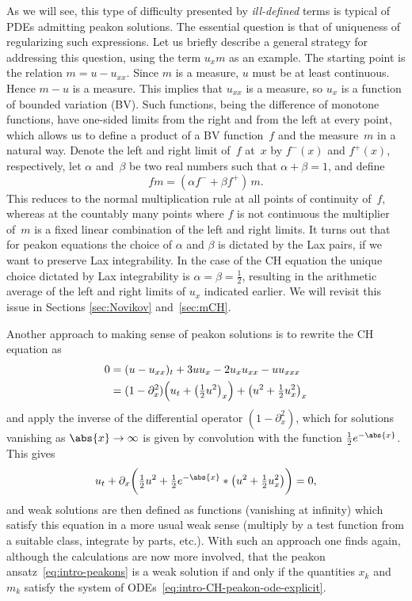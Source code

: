 \documentclass[10pt,a4paper]{article} \pdfoutput=1 
\begin{document}
As we will see, this type of difficulty presented by \emph{ill-defined} terms is typical of
PDEs admitting peakon solutions.
The essential question is that of uniqueness of regularizing such expressions.
Let us briefly describe a general strategy for addressing this question,
using the term $u_x m$ as an example.
The starting point is the relation $m=u-u_{xx}$. Since $m$ is a
measure, $u$ must be at least continuous. Hence $m-u$ is a measure.
This implies that $u_{xx}$ is a measure, so $u_x$ is a function of
bounded variation (BV).
Such functions, being the difference of monotone functions,
have one-sided limits from the right and from the left at every point,
which allows us to define a product of a BV function~$f$ and the measure~$m$ in a natural way.
Denote the left and right limit of~$f$ at~$x$ by $f^-(x)$ and $f^+(x)$, respectively,
let $\alpha$ and~$\beta$ be two real numbers such that $\alpha +\beta=1$,
and define
\begin{equation}
  \label{eq:CH-multiplication-f-times-m}
  f m = (\alpha f^- + \beta f^+) \, m
  .
\end{equation}
This reduces to the normal multiplication rule at all points of continuity of~$f$,
whereas at the countably many points where $f$ is not continuous
the multiplier of~$m$ is a fixed linear combination of the left and right limits.
It turns out that for peakon equations the choice of $\alpha$ and $\beta$ is dictated by the Lax pairs, if we want to preserve Lax integrability.
In the case of the CH equation the unique choice dictated by Lax integrability is
$\alpha = \beta = \frac12$,
resulting in the arithmetic average of the left and right limits of $u_x$ indicated earlier.
We will revisit this issue in Sections \ref{sec:Novikov} and~\ref{sec:mCH}.

Another approach to making sense of peakon solutions is to rewrite the CH equation as
\begin{equation}
  \begin{split}
    0
    &= (u-u_{xx})_t + 3 uu_x - 2 u_x u_{xx} - uu_{xxx}
    \\
    &= (1-\partial_x^2) \Bigl( u_t + \bigl( \tfrac12 u^2 \bigr)_x \Bigr)
    + \bigl( u^2 + \tfrac12 u_x^2 \bigr)_x
  \end{split}
\end{equation}
and apply the inverse of the differential operator $(1-\partial_x^2)$,
which for solutions vanishing as $\abs{x} \to \infty$
is given by convolution with the function $\tfrac12 e^{-\abs{x}}$.
This gives
\begin{equation}
  \label{eq:CH-eulerian}
  u_t + \partial_x \biggl(
  \tfrac12 u^2 + \tfrac12 e^{-\abs{x}} * \bigl( u^2+\tfrac12 u_x^2 \bigr)
  \biggr)
  = 0
  ,
\end{equation}
and weak solutions are then defined as functions (vanishing at infinity)
which satisfy this equation in a more usual weak sense
(multiply by a test function from a suitable class, integrate by parts, etc.).
With such an approach one finds again, although the calculations are now more involved,
that the peakon ansatz~\eqref{eq:intro-peakons} is a weak solution if and only if
the quantities $x_k$ and~$m_k$ satisfy the system of ODEs~\eqref{eq:intro-CH-peakon-ode-explicit}.
\end{document}
